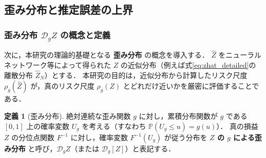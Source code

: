 \documentclass[a4paper,10pt]{jsarticle}
\theoremstyle{definition}
\newtheorem{definition}{定義}[section]
\renewcommand{\Finv}{F^{-1}}
\newcommand{\Prob}{\mathbb{P}}
\newcommand{\dist}{\mathcal{D}_g}
\begin{document}
\subsection{歪み分布と推定誤差の上界}
\label{subsec:bound}

\subsubsection{歪み分布 $\mathcal{D}_g Z$ の概念と定義}
次に，本研究の理論的基礎となる \textbf{歪み分布} の概念を導入する．
$\hat Z$ をニューラルネットワーク等によって得られた $Z$ の近似分布（例えば式\eqref{eq:zhat_detailed}の離散分布 $\hat Z_N$）とする．
本研究の目的は，近似分布から計算したリスク尺度 $\rho_g(\hat Z)$ が，真のリスク尺度 $\rho_g(Z)$ とどれだけ近いかを厳密に評価することである．

\begin{definition}[歪み分布]
\label{def:distorted}
絶対連続な歪み関数 $g$ に対し，累積分布関数が $g$ である $[0,1]$ 上の確率変数 $U_g$ を考える（すなわち $\Prob(U_g \le u) = g(u)$）．
真の損益 $Z$ の分位点関数 $\Finv$ に対し，確率変数 $\Finv(U_g)$ が従う分布を \textbf{$Z$ の $g$ による歪み分布} と呼び，$\dist Z$（または $\mathcal{D}_g[Z]$）と表記する．
\end{definition}
\end{document}
